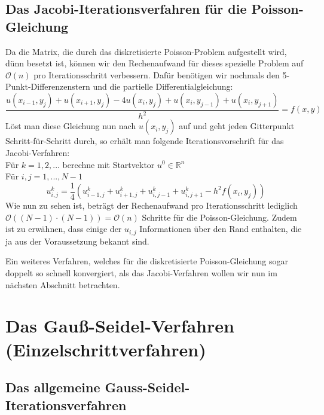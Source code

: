 \subsection{Das Jacobi-Iterationsverfahren für die Poisson-Gleichung}
Da die Matrix, die durch das diskretisierte Poisson-Problem aufgestellt wird, dünn besetzt ist, können wir den Rechenaufwand für dieses spezielle Problem auf $\mathcal{O}(n)$ pro Iterationsschritt verbessern. Dafür benötigen wir nochmals den 5-Punkt-Differenzenstern und die partielle Differentialgleichung:
\begin{equation}
\frac {u(x_{i-1},y_{j}) + u(x_{i+1},y_{j}) - 4u(x_{i},y_{j}) + u(x_{i},y_{j-1}) + u(x_{i},y_{j+1})} {h^{2}} = f(x,y)
\end{equation}
Löst man diese Gleichung nun nach $u(x_{i},y_{j})$ auf und geht jeden Gitterpunkt Schritt-für-Schritt durch, so erhält man folgende Iterationsvorschrift für das Jacobi-Verfahren: \\
Für $k = 1,2,...$ berechne mit Startvektor $u^{0} \in \mathbb{R}^{n}$ \\
Für $i,j = 1,...,N-1$
\begin{equation}
u^{k}_{i,j} =   \frac {1} {4} (u^{k}_{i-1,j} + u^{k}_{i+1,j} + u^{k}_{i,j-1} + u^{k}_{i,j+1} - h^{2}f(x_{i},y_{j}))
\end{equation}
Wie nun zu sehen ist, beträgt der Rechenaufwand pro Iterationsschritt lediglich $\mathcal{O}((N-1) \cdot (N-1)) = \mathcal{O}(n)$ Schritte für die Poisson-Gleichung. Zudem ist zu erwähnen, dass einige der $u_{i,j}$ Informationen über den Rand enthalten, die ja aus der Voraussetzung bekannt sind.

Ein weiteres Verfahren, welches für die diskretisierte Poisson-Gleichung sogar doppelt so schnell konvergiert, als das Jacobi-Verfahren wollen wir nun im nächsten Abschnitt betrachten.


\section{Das Gauß-Seidel-Verfahren (Einzelschrittverfahren)}\label{s.Das Gauss-Seidel-Verfahren}

\subsection{Das allgemeine Gauss-Seidel-Iterationsverfahren}

